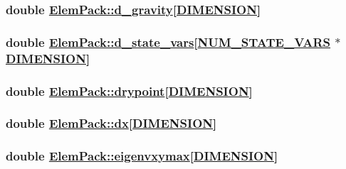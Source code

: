 \hypertarget{structElemPack_o40}{
\subsubsection[d\_\-gravity]{\setlength{\rightskip}{0pt plus 5cm}double \hyperlink{structElemPack_o40}{Elem\-Pack::d\_\-gravity}\mbox{[}\hyperlink{constant_8h_a15}{DIMENSION}\mbox{]}}}
\label{structElemPack_o40}


\hypertarget{structElemPack_o32}{
\subsubsection[d\_\-state\_\-vars]{\setlength{\rightskip}{0pt plus 5cm}double \hyperlink{structElemPack_o32}{Elem\-Pack::d\_\-state\_\-vars}\mbox{[}\hyperlink{constant_8h_a45}{NUM\_\-STATE\_\-VARS} $\ast$\hyperlink{constant_8h_a15}{DIMENSION}\mbox{]}}}
\label{structElemPack_o32}


\hypertarget{structElemPack_o47}{
\subsubsection[drypoint]{\setlength{\rightskip}{0pt plus 5cm}double \hyperlink{structElemPack_o47}{Elem\-Pack::drypoint}\mbox{[}\hyperlink{constant_8h_a15}{DIMENSION}\mbox{]}}}
\label{structElemPack_o47}


\hypertarget{structElemPack_o34}{
\subsubsection[dx]{\setlength{\rightskip}{0pt plus 5cm}double \hyperlink{structElemPack_o34}{Elem\-Pack::dx}\mbox{[}\hyperlink{constant_8h_a15}{DIMENSION}\mbox{]}}}
\label{structElemPack_o34}


\hypertarget{structElemPack_o35}{
\subsubsection[eigenvxymax]{\setlength{\rightskip}{0pt plus 5cm}double \hyperlink{structElemPack_o35}{Elem\-Pack::eigenvxymax}\mbox{[}\hyperlink{constant_8h_a15}{DIMENSION}\mbox{]}}}
\label{structElemPack_o35}


